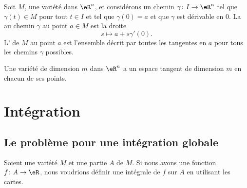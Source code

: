 Soit \( M\), une variété dans \( \eR^n\), et considérons un chemin \( \gamma\colon I\to \eR^n\) tel que \( \gamma(t)\in M\) pour tout \( t\in I\) et tel que \( \gamma(0)=a\) et que \( \gamma\) est dérivable en \( 0\). La  au chemin \( \gamma\) au point \( a\in M\) est la droite
\begin{equation}
	s\mapsto a+s\gamma'(0).
\end{equation}
L' de \( M\) au point \( a\) est l'ensemble décrit par toutes les tangentes en \( a\) pour tous les chemins \( \gamma\) possibles.

\begin{proposition}         \label{PropDimEspTanVarConst}
	Une variété de dimension \( m\) dans \( \eR^n\) a un espace tangent de dimension \( m\) en chacun de ses points.
\end{proposition}

\section{Intégration}

\subsection{Le problème pour une intégration globale}

Soient une variété \( M\) et une partie \( A\) de \( M\). Si nous avons une fonction \( f\colon A\to \eR\), nous voudrions définir une intégrale de \( f\) sur \( A\) en utilisant les cartes.

